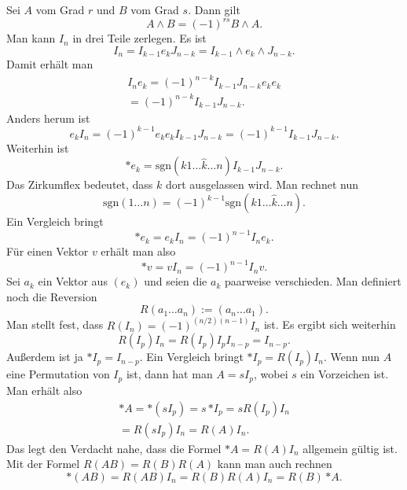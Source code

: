 \documentclass[a4paper,10pt,fleqn,twocolumn,twoside]{article}
\numberwithin{equation}{section}
\begin{document}
Sei $A$ vom Grad $r$ und $B$ vom Grad $s$. Dann gilt
\begin{equation}
A\wedge B = (-1)^{rs} B\wedge A.
\end{equation}
Man kann $I_n$ in drei Teile zerlegen. Es ist
\begin{equation}
I_n = I_{k-1}e_k J_{n-k} = I_{k-1}\wedge e_k\wedge J_{n-k}.
\end{equation}
Damit erhält man
\begin{gather*}
I_n e_k = (-1)^{n-k} I_{k-1}J_{n-k}e_ke_k\\
= (-1)^{n-k} I_{k-1}J_{n-k}.
\end{gather*}
Anders herum ist
\[e_k I_n =  (-1)^{k-1} e_ke_k I_{k-1}J_{n-k}
= (-1)^{k-1} I_{k-1}J_{n-k}.\]
Weiterhin ist
\begin{equation}
*e_k = \mathrm{sgn}(k1\ldots\hat k\ldots n)I_{k-1}J_{n-k}.
\end{equation}
Das Zirkumflex bedeutet, dass $k$ dort ausgelassen wird.
Man rechnet nun
\begin{equation}
\mathrm{sgn}(1\ldots n) = (-1)^{k-1}
\mathrm{sgn}(k1\ldots\hat k\ldots n).
\end{equation}
Ein Vergleich bringt
\begin{equation}
*e_k = e_k I_n = (-1)^{n-1} I_n e_k.
\end{equation}
Für einen Vektor $v$ erhält man also
\begin{equation}
*v = vI_n = (-1)^{n-1}I_n v.
\end{equation}
Sei $a_k$ ein Vektor aus $(e_k)$ und seien die $a_k$
paarweise verschieden.
Man definiert noch die Reversion
\begin{equation}
R(a_1\ldots a_n) := (a_n\ldots a_1).
\end{equation}
Man stellt fest, dass $R(I_n)=(-1)^{(n/2)(n-1)}I_n$ ist.
Es ergibt sich weiterhin
\begin{equation}
R(I_p)I_n = R(I_p)I_p I_{n-p} = I_{n-p}.
\end{equation}
Außerdem ist ja $*I_p = I_{n-p}$. Ein Vergleich bringt $*I_p = R(I_p)I_n$.
Wenn nun $A$ eine Permutation von $I_p$ ist, dann hat man $A=sI_p$,
wobei $s$ ein Vorzeichen ist. Man erhält also
\begin{gather*}
*A = *(sI_p) = s\,{*I_p} = sR(I_p)I_n\\
= R(sI_p)I_n = R(A)I_n.
\end{gather*}
Das legt den Verdacht nahe, dass die Formel
$*A=R(A)I_n$ allgemein gültig ist.
Mit der Formel $R(AB) = R(B)R(A)$ kann man auch rechnen
\[*(AB) = R(AB)I_n = R(B)R(A)I_n = R(B)\,{*A}.\]
\end{document}

